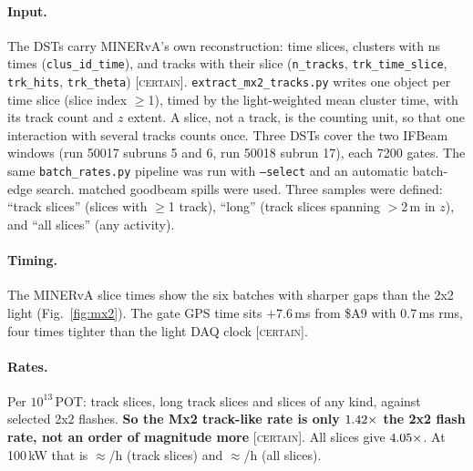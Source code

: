 \documentclass[11pt]{article}
\newcommand{\CERT}{\textsc{[certain]}}
\begin{document}
\paragraph{Input.} The DSTs carry MINERvA's own reconstruction: time slices, clusters with
ns times (\texttt{clus\_id\_time}), and tracks with their slice (\texttt{n\_tracks},
\texttt{trk\_time\_slice}, \texttt{trk\_hits}, \texttt{trk\_theta}) \CERT.
\texttt{extract\_mx2\_tracks.py} writes one object per time slice (slice index $\geq$1),
timed by the light-weighted mean cluster time, with its track count and $z$ extent. A slice,
not a track, is the counting unit, so that one interaction with several tracks counts once.
Three DSTs cover the two IFBeam windows (run 50017 subruns 5 and 6, run 50018 subrun 17),
each 7200 gates. The same \texttt{batch\_rates.py} pipeline was run with
\texttt{--select} and an automatic batch-edge search. \MXspills{} matched goodbeam spills
were used. Three samples were defined: ``track slices'' (slices with $\geq$1 track),
``long'' (track slices spanning $>$2\,m in $z$), and ``all slices'' (any activity).

\paragraph{Timing.} The MINERvA slice times show the six batches with sharper gaps than the
2x2 light (Fig.~\ref{fig:mx2}). The gate GPS time sits $+7.6$\,ms from \$A9 with
0.7\,ms rms, four times tighter than the light DAQ clock \CERT.

\paragraph{Rates.} Per $10^{13}$\,POT: \MXtrkPerEthirteen{} track slices,
\MXlongPerEthirteen{} long track slices and \MXallPerEthirteen{} slices of any kind, against
\FRperEthirteen{} selected 2x2 flashes. \textbf{So the Mx2 track-like rate is only
$1.42\times$ the 2x2 flash rate, not an order of magnitude more} \CERT. All slices give
$4.05\times$. At 100\,kW that is $\approx$\MXtrkPerHour/h (track slices) and
$\approx$\MXallPerHour/h (all slices).
\end{document}
